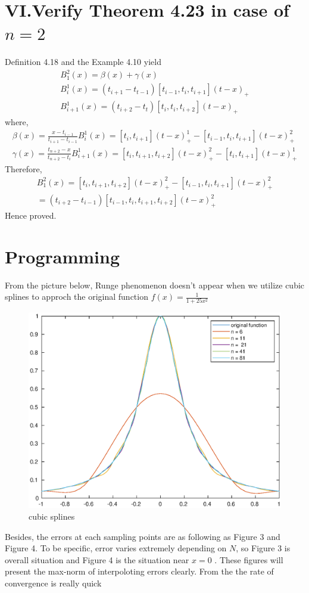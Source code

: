 \documentclass[twoside,a4paper]{article}
\begin{document}
\section*{VI.Verify Theorem 4.23 in case of $n=2$}
Definition 4.18 and the Example 4.10 yield
\begin{gather}
B^2_1(x)=\beta(x)+\gamma(x)\\
B_i^1(x)=(t_{i+1}-t_{t-1})[t_{i-1},t_{i},t_{i+1}](t-x)_+\\
B_{i+1}^1(x)=(t_{i+2}-t_{t})[t_{i},t_{i},t_{i+2}](t-x)_+
\end{gather}
where,
\begin{gather}
\beta(x)=\frac{x-t_{i-1}}{t_{i+1}-t_{i-1}}B_i^1(x)=[t_i,t_{i+1}](t-x)_{+}^1-[t_{i-1},t_i,t_{i+1}](t-x)_{+}^{2}\\
\gamma(x)=\frac{t_{n+2}-x}{t_{n+2}-t_i}B_{i+1}^1(x)=[t_i,t_{i+1},t_{i+2}](t-x)^2_{+}-[t_i,t_{i+1}](t-x)_+^1
\end{gather}
Therefore,
\begin{gather}
B^2_1(x)=[t_i,t_{i+1},t_{i+2}](t-x)_{+}^{2}-[t_{i-1},t_{i},t_{i+1}](t-x)_{+}^{2}\\
=(t_{i+2}-t_{i-1})[t_{i-1},t_i,t_{i+1},t_{i+2}](t-x)_+^2
\end{gather}
Hence proved.
\\

\section*{Programming}
From the picture below, Runge phenomenon doesn't appear when we utilize cubic splines to approch the original function $ f(x)=\frac{1}{1+25x^2}$


\begin{figure}[h]
\includegraphics[width=7in]{cubic_splines.eps}
 \caption{cubic splines}
\end{figure}
Besides, the errors at each sampling points are as following as Figure 3 and Figure 4. To
be specific, error varies extremely depending on $N$, so Figure 3 is overall situation and Figure 4 is the situation near $x=0$ . These figures will present the max-norm of interpoloting errors clearly. From the the rate of convergence is really quick 
\end{document}
